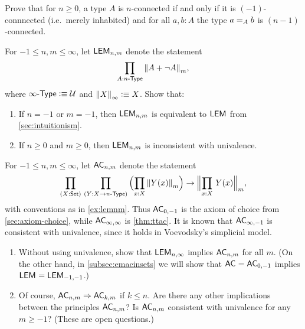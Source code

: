 \begin{ex}\label{ex:connectivity-inductively}
  Prove that for $n\ge 0$, a type $A$ is $n$-connected if and only if it is $(-1)$-connnected (i.e.\ merely inhabited) and for all $a,b:A$ the type $\id[A]ab$ is $(n-1)$-connected.
\end{ex}

\begin{ex}\label{ex:lemnm}
  For $-1\le n,m \le\infty$, let $\LEM{n,m}$ denote the statement
  \[ \prd{A:\ntype{n}} \trunc m{A + \neg A},\]
  where $\ntype{\infty} \defeq \type$ and $\trunc{\infty}{X}\defeq X$.
  Show that:
  \begin{enumerate}
  \item If $n=-1$ or $m=-1$, then $\LEM{n,m}$ is equivalent to $\LEM{}$ from \autoref{sec:intuitionism}.
  \item If $n\ge 0$ and $m\ge 0$, then $\LEM{n,m}$ is inconsistent with univalence.
  \end{enumerate}
\end{ex}

\begin{ex}\label{ex:acnm}
  For $-1\le n,m\le\infty$, let $\choice{n,m}$ denote the statement
  \[ \prd{X:\set}{Y:X\to\ntype{n}}
  \Parens{\prd{x:X} \trunc m{Y(x)}}
  \to
  \Trunc m{\prd{x:X} Y(x)},
  \]
  with conventions as in \autoref{ex:lemnm}.
  Thus $\choice{0,-1}$ is the axiom of choice from \autoref{sec:axiom-choice}, while $\choice{\infty,\infty}$ is \autoref{thm:ttac}.
  It is known that $\choice{\infty,-1}$ is consistent with univalence, since it holds in Voevodsky's simplicial model.
  \begin{enumerate}
  \item Without using univalence, show that $\LEM{n,\infty}$ implies $\choice{n,m}$ for all $m$.
    (On the other hand, in \autoref{subsec:emacinsets} we will show that $\choice{}=\choice{0,-1}$ implies $\LEM{}=\LEM{-1,-1}$.)
  \item Of course, $\choice{n,m}\Rightarrow \choice{k,m}$ if $k\le n$.
    Are there any other implications between the principles $\choice{n,m}$?
    Is $\choice{n,m}$ consistent with univalence for any $m\ge -1$?
    (These are open questions.)
  \end{enumerate}
\end{ex}

